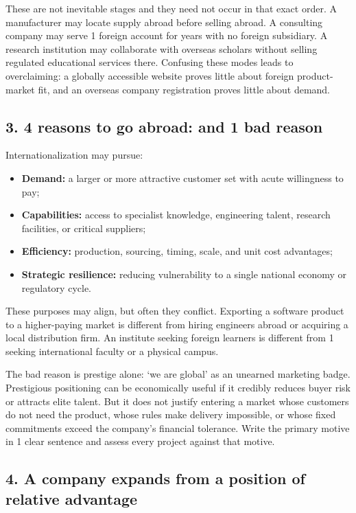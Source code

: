 These are not inevitable stages and they need not occur in that exact order. A manufacturer may locate supply abroad before selling abroad. A consulting company may serve 1 foreign account for years with no foreign subsidiary. A research institution may collaborate with overseas scholars without selling regulated educational services there. Confusing these modes leads to overclaiming: a globally accessible website proves little about foreign product-market fit, and an overseas company registration proves little about demand.

\subsection{3. 4 reasons to go abroad: and 1 bad reason}

Internationalization may pursue:
\begin{itemize}
    \item \textbf{Demand:} a larger or more attractive customer set with acute willingness to pay;
    \item \textbf{Capabilities:} access to specialist knowledge, engineering talent, research facilities, or critical suppliers;
    \item \textbf{Efficiency:} production, sourcing, timing, scale, and unit cost advantages;
    \item \textbf{Strategic resilience:} reducing vulnerability to a single national economy or regulatory cycle.
\end{itemize}

These purposes may align, but often they conflict. Exporting a software product to a higher-paying market is different from hiring engineers abroad or acquiring a local distribution firm. An institute seeking foreign learners is different from 1 seeking international faculty or a physical campus.

The bad reason is prestige alone: `we are global' as an unearned marketing badge. Prestigious positioning can be economically useful if it credibly reduces buyer risk or attracts elite talent. But it does not justify entering a market whose customers do not need the product, whose rules make delivery impossible, or whose fixed commitments exceed the company's financial tolerance. Write the primary motive in 1 clear sentence and assess every project against that motive.

\subsection{4. A company expands from a position of relative advantage}

